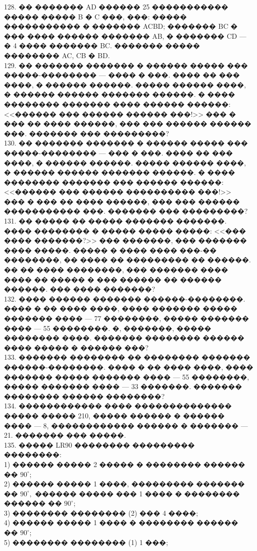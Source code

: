 \documentclass[12pt]{article}
\begin{document}
128. �� ������� AD ������ 25 ����������� ����� ����� B � C ���, ���: ����� ����������� � ������� ACBD; ������� BC � ��� ���� ������ ������� AB, � ������� CD --- � 4 ���� ������� BC. ������� ����� �������� AC, CB � BD.\\
129. �� ������� ������� � ������ ����� ��� �����-�������� --- ���� � ���. ���� �� ��� ����, � ������ ������. ����� ������ ����, � ������ ������ ������� ������. � ���� �������� ������� ���� ������ ������: <<������ ��� ������ ������ ���!>> ��� � ��� �� ���� ������, ��� ��� ������ ������ ���. ������� ��� ���������?\\
130. �� ������� ������� � ������ ����� ��� �����-�������� --- ��� � ���. ���� �� ��� ����, � ������ ������. ����� ������ ����, � ������ ������ ������� ������. � ���� �������� ������� ��� ������ ������: <<������ ��� ������ ���������� ���!>> ��� � ��� �� ���� ������, ��� ��� ������ ����������� ���. ������� ��� ���������?\\
131. �� ����� �� ����� ������� �������. ���� �������� � ����� ����� �����: <<��� ���� �������?>> ��� �������, ��� ������� ���� �����. ����� � ���� ���� ���-�� ��������, �� ���� �� ��������� �� ������. �� �� ���� ��������, ��� ������� ���� ���� �� ����� � ��� ������ �� ������ ������. ��� ���� �������?\\
132. ���� ������ ������� ������-��������. ���� � �� ���� ����, ���� ������� ����� ������� ���� --- 77 ��������, ����� ������� ���� --- 55 ��������. �, �������, ����� �������� ����. ������� �������� ������ ���� ����� � ������ ���?\\
133. ������� �������� �� �������� ������� ������-��������. ���� � �� ���� ����, ���� ������� ����� ������� ���� --- 55 ��������, ����� ������� ���� --- 33 �������. ������� �������� ������ ��������?\\
134. ������������ ���� �������������� ����� ����� 210, ����� ������ � ������ ���� --- 8, ������������ ������ � ������� --- 21. ������� ��� �����.\\
135. ����� LR90 �������� ��������� ��������:\\
1) ������ ����� 2 ����� � �������� ������ �� $90^\circ$;\\
2) ������ ����� 1 ����, ��������� ������� �� $90^\circ,$ ������ ����� ��� 1 ���� � �������� ������ �� $90^\circ$;\\
3) �������� �������� (2) ��� 4 ����;\\
4) ������ ����� 1 ���� � �������� ������ �� $90^\circ$;\\
5) �������� �������� (1) 1 ���;\\
\end{document}
